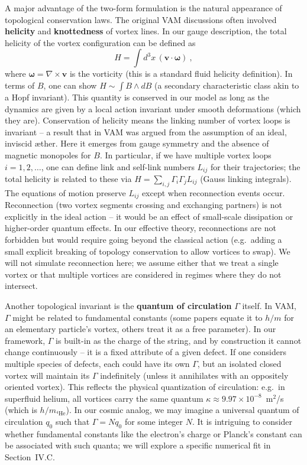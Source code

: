 \documentclass[12pt]{article}
\begin{document}
A major advantage of the two-form formulation is the natural appearance of topological conservation laws. The original VAM discussions often involved \textbf{helicity} and \textbf{knottedness} of vortex lines. In our gauge description, the total helicity of the vortex configuration can be defined as
\begin{equation}
H = \int d^3x\, (\mathbf{v}\cdot \mathbf{\omega})~,
\end{equation}
where $\mathbf{\omega} = \nabla \times \mathbf{v}$ is the vorticity (this is a standard fluid helicity definition). In terms of $B$, one can show $H \sim \int B \wedge dB$ (a secondary characteristic class akin to a Hopf invariant). This quantity is conserved in our model as long as the dynamics are given by a local action invariant under smooth deformations (which they are). Conservation of helicity means the linking number of vortex loops is invariant -- a result that in VAM was argued from the assumption of an ideal, inviscid æther. Here it emerges from gauge symmetry and the absence of magnetic monopoles for $B$. In particular, if we have multiple vortex loops $i=1,2,\dots$, one can define link and self-link numbers $L_{ij}$ for their trajectories; the total helicity is related to these via $H = \sum_{i,j} \Gamma_i \Gamma_j L_{ij}$ (Gauss linking integrals). The equations of motion preserve $L_{ij}$ except when reconnection events occur. Reconnection (two vortex segments crossing and exchanging partners) is not explicitly in the ideal action -- it would be an effect of small-scale dissipation or higher-order quantum effects. In our effective theory, reconnections are not forbidden but would require going beyond the classical action (e.g.\ adding a small explicit breaking of topology conservation to allow vortices to swap). We will not simulate reconnection here; we assume either that we treat a single vortex or that multiple vortices are considered in regimes where they do not intersect.

Another topological invariant is the \textbf{quantum of circulation} $\Gamma$ itself. In VAM, $\Gamma$ might be related to fundamental constants (some papers equate it to $h/m$ for an elementary particle's vortex, others treat it as a free parameter). In our framework, $\Gamma$ is built-in as the charge of the string, and by construction it cannot change continuously -- it is a fixed attribute of a given defect. If one considers multiple species of defects, each could have its own $\Gamma$, but an isolated closed vortex will maintain its $\Gamma$ indefinitely (unless it annihilates with an oppositely oriented vortex). This reflects the physical quantization of circulation: e.g.\ in superfluid helium, all vortices carry the same quantum $\kappa \approx 9.97\times10^{-8}$~m$^2$/s (which is $h/m_{^4\mathrm{He}}$). In our cosmic analog, we may imagine a universal quantum of circulation $q_0$ such that $\Gamma = N q_0$ for some integer $N$. It is intriguing to consider whether fundamental constants like the electron's charge or Planck's constant can be associated with such quanta; we will explore a specific numerical fit in Section~IV.C.
\end{document}
